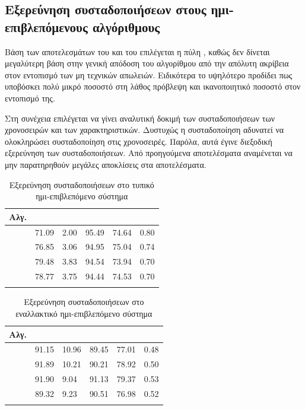 \subsection{Εξερεύνηση συσταδοποιήσεων στους ημι-επιβλεπόμενους αλγόριθμους}
Βάση των αποτελεσμάτων του  και του  επιλέγεται η πύλη , καθώς δεν δίνεται μεγαλύτερη βάση στην γενική απόδοση του αλγορίθμου από την απόλυτη ακρίβεια στον εντοπισμό των μη τεχνικών απωλειών. Ειδικότερα το υψηλότερο  προδίδει πως υποβόσκει πολύ μικρό ποσοστό στη λάθος πρόβλεψη και ικανοποιητικό ποσοστό στον εντοπισμό της.\par
Στη συνέχεια επιλέγεται να γίνει αναλυτική δοκιμή των συσταδοποιήσεων των χρονοσειρών και των χαρακτηριστικών. Δυστυχώς η συσταδοποίηση  αδυνατεί να ολοκληρώσει συσταδοποίηση στις χρονοσειρές. Παρόλα, αυτά έγινε διεξοδική εξερεύνηση των συσταδοποιήσεων. Από προηγούμενα αποτελέσματα αναμένεται να μην παρατηρηθούν μεγάλες αποκλίσεις στα αποτελέσματα.
\begin{center}
\begin{longtabu} to 0.8\textwidth { | X[c] || X[c] | X[c] | X[c] | X[c] | X[c] |  }
 \hline
 Αλγ.&   &  &  &  & \\
\hline
  & 71.09 & 2.00 & 95.49 & 74.64 & 0.80\\
 \hline
 & 76.85 & 3.06 & 94.95 & 75.04 & 0.74\\ 
\hline
 & 79.48& 3.83 & 94.54 & 73.94 & 0.70\\ 
 \hline
   & 78.77 & 3.75 & 94.44 & 74.53 & 0.70\\
\hline
\caption{Εξερεύνηση συσταδοποιήσεων στο τυπικό ημι-επιβλεπόμενο σύστημα}
\label{tab:testclustersemisup1}
\end{longtabu}
\end{center}

\begin{center}
\begin{longtabu} to 0.8\textwidth { | X[c] || X[c] | X[c] | X[c] | X[c] | X[c] |  }
 \hline
 Αλγ.&   &  &  &  & \\
\hline
  & 91.15 & 10.96  & 89.45 & 77.01 & 0.48\\
 \hline
 & 91.89 & 10.21  & 90.21 & 78.92 & 0.50\\ 
\hline
 & 91.90 & 9.04  & 91.13 & 79.37 & 0.53\\ 
 \hline
   & 89.32 & 9.23  & 90.51 & 76.98 & 0.52\\
\hline
\caption{Εξερεύνηση συσταδοποιήσεων στο εναλλακτικό ημι-επιβλεπόμενο σύστημα}
\label{tab:testclustersemisup2}
\end{longtabu}
\end{center}
